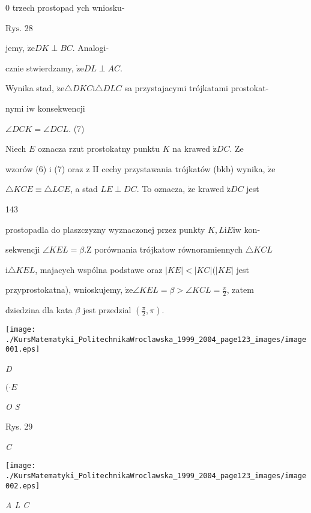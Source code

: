 \documentclass[a4paper,12pt]{article}
\begin{document}
$0$ trzech prostopad ych wniosku-

$\mathrm{R}\mathrm{y}\mathrm{s}$. 28

jemy, $\dot{\mathrm{z}}\mathrm{e} DK \perp BC$. Analogi-

cznie stwierdzamy, $\dot{\mathrm{z}}\mathrm{e} DL\perp AC.$

Wynika stad, $\dot{\mathrm{z}}\mathrm{e}\triangle DKC\mathrm{i}\triangle DLC$ sa przystajacymi trójkatami prostokat-

nymi $\mathrm{i}\mathrm{w}$ konsekwencji

$\angle DCK=\angle DCL$.   (7)

Niech $E$ oznacza rzut prostokatny punktu $K$ na krawed $\acute{\mathrm{z}} DC$. Ze

wzorów (6) $\mathrm{i}$ (7) oraz $\mathrm{z}$ II cechy przystawania trójkatów (bkb) wynika, $\dot{\mathrm{z}}\mathrm{e}$

$\triangle KCE \equiv \triangle LCE$, a stad $ LE\perp DC$. To oznacza, $\dot{\mathrm{z}}\mathrm{e}$ krawed $\acute{\mathrm{z}} DC$ jest





143

prostopadla do plaszczyzny wyznaczonej przez punkty $K, L\mathrm{i}E\mathrm{i}\mathrm{w}$ kon-

sekwencji $\angle KEL=\beta. \mathrm{Z}$ porównania trójkatow równoramiennych $\triangle KCL$

$\mathrm{i} \triangle KEL$, majacych wspólna podstawe oraz $|KE| < |KC| (|KE|$ jest

przyprostokatna), wnioskujemy, $\dot{\mathrm{z}}\mathrm{e} \angle KEL = \beta > \angle KCL = \displaystyle \frac{\pi}{2}$, zatem

dziedzina dla kata $\beta$ jest przedzial $(\displaystyle \frac{\pi}{2},\pi).$
\begin{center}
\texttt{[image: ./KursMatematyki\_PolitechnikaWroclawska\_1999\_2004\_page123\_images/image001.eps]}
\end{center}
{\it D}

$(\cdot E$

{\it O S}

Rys. 29

{\it C}
\begin{center}
\texttt{[image: ./KursMatematyki\_PolitechnikaWroclawska\_1999\_2004\_page123\_images/image002.eps]}
\end{center}
{\it A  L C}
\end{document}
